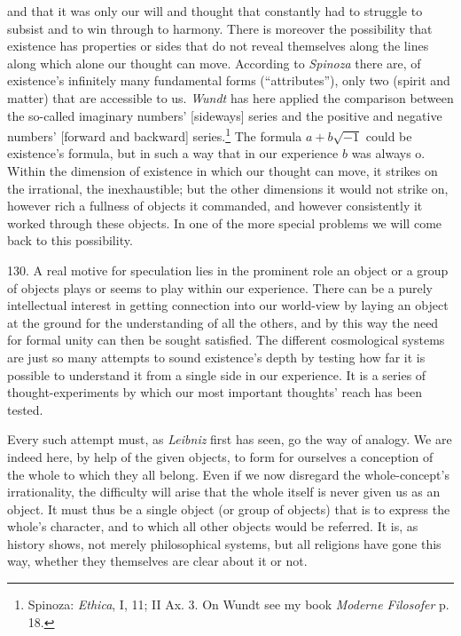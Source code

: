 \documentclass[12pt,a4paper]{book}
\newcommand{\opage}[1]{\marginnote{\footnotesize\textit{[#1]}}}
\begin{document}
and that it was only our will and thought that constantly had to struggle to subsist and
to win through to harmony. There is moreover the possibility that existence has properties
or sides that do not reveal themselves along the lines along which alone our thought can
move. According to \emph{Spinoza} there are, of existence's infinitely many fundamental
forms (``attributes''), only two (spirit and matter) that are accessible to us. \emph{Wundt}
has here applied the comparison between the so-called imaginary numbers' [sideways] series
and the positive and negative numbers' [forward and backward] series.\footnote{Spinoza:
\emph{Ethica}, I, 11; II Ax. 3. On Wundt see my book \emph{Moderne Filosofer} p. 18.} The
formula $a+b\sqrt{-1}$ could be existence's formula, but in such a way that in our experience
$b$ was always o. Within the dimension of existence in which our thought can move, it strikes
on the irrational, the inexhaustible; but the other dimensions it would not strike on,
however rich a fullness of objects it commanded, and however consistently it worked through
these objects. In one of the more special problems we will come back to this possibility.

130. A real motive for speculation lies in the prominent role an object or a group of objects
plays or seems to play within our experience. There can be a purely intellectual interest in
getting connection into our world-view by laying an object at the ground for the understanding
of all the others, and by this way the need for formal unity can then be sought satisfied. The
different cosmological systems are just so many attempts to sound existence's depth by testing
how far it is \opage{311}possible to understand it from a single side in our experience. It is a series of
thought-experiments by which our most important thoughts' reach has been tested.

Every such attempt must, as \emph{Leibniz} first has seen, go the way of analogy. We are
indeed here, by help of the given objects, to form for ourselves a conception of the whole to
which they all belong. Even if we now disregard the whole-concept's irrationality, the
difficulty will arise that the whole itself is never given us as an object. It must thus be a
single object (or group of objects) that is to express the whole's character, and to which all
other objects would be referred. It is, as history shows, not merely philosophical systems, but
all religions have gone this way, whether they themselves are clear about it or not.
\end{document}
